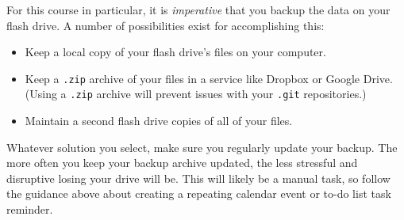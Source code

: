 \documentclass[]{book}
\providecommand{\tightlist}{%
  \setlength{\itemsep}{0pt}\setlength{\parskip}{0pt}}
\theoremstyle{definition}
\theoremstyle{definition}
\theoremstyle{definition}
\theoremstyle{remark}
\begin{document}
For this course in particular, it is \emph{imperative} that you backup
the data on your flash drive. A number of possibilities exist for
accomplishing this:

\begin{itemize}
\tightlist
\item
  Keep a local copy of your flash drive's files on your computer.
\item
  Keep a \texttt{.zip} archive of your files in a service like Dropbox
  or Google Drive. (Using a \texttt{.zip} archive will prevent issues
  with your \texttt{.git} repositories.)
\item
  Maintain a second flash drive copies of all of your files.
\end{itemize}

Whatever solution you select, make sure you regularly update your
backup. The more often you keep your backup archive updated, the less
stressful and disruptive losing your drive will be. This will likely be
a manual task, so follow the guidance above about creating a repeating
calendar event or to-do list task reminder.


\end{document}
